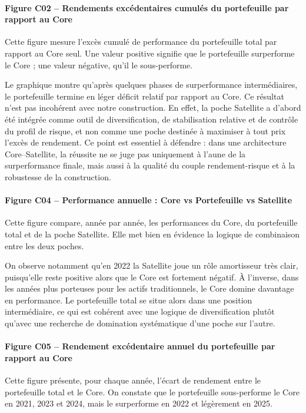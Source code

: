 \documentclass{article}
\begin{document}
\paragraph{Figure C02 -- Rendements excédentaires cumulés du portefeuille par rapport au Core}
Cette figure mesure l’excès cumulé de performance du portefeuille total par rapport au Core seul. Une valeur positive signifie que le portefeuille surperforme le Core ; une valeur négative, qu’il le sous-performe.

Le graphique montre qu’après quelques phases de surperformance intermédiaires, le portefeuille termine en léger déficit relatif par rapport au Core. Ce résultat n’est pas incohérent avec notre construction. En effet, la poche Satellite a d’abord été intégrée comme outil de diversification, de stabilisation relative et de contrôle du profil de risque, et non comme une poche destinée à maximiser à tout prix l’excès de rendement. Ce point est essentiel à défendre : dans une architecture Core--Satellite, la réussite ne se juge pas uniquement à l’aune de la surperformance finale, mais aussi à la qualité du couple rendement-risque et à la robustesse de la construction.

\paragraph{Figure C04 -- Performance annuelle : Core vs Portefeuille vs Satellite}
Cette figure compare, année par année, les performances du Core, du portefeuille total et de la poche Satellite. Elle met bien en évidence la logique de combinaison entre les deux poches.

On observe notamment qu’en 2022 la Satellite joue un rôle amortisseur très clair, puisqu’elle reste positive alors que le Core est fortement négatif. À l’inverse, dans les années plus porteuses pour les actifs traditionnels, le Core domine davantage en performance. Le portefeuille total se situe alors dans une position intermédiaire, ce qui est cohérent avec une logique de diversification plutôt qu’avec une recherche de domination systématique d’une poche sur l’autre.

\paragraph{Figure C05 -- Rendement excédentaire annuel du portefeuille par rapport au Core}
Cette figure présente, pour chaque année, l’écart de rendement entre le portefeuille total et le Core. On constate que le portefeuille sous-performe le Core en 2021, 2023 et 2024, mais le surperforme en 2022 et légèrement en 2025.
\end{document}
